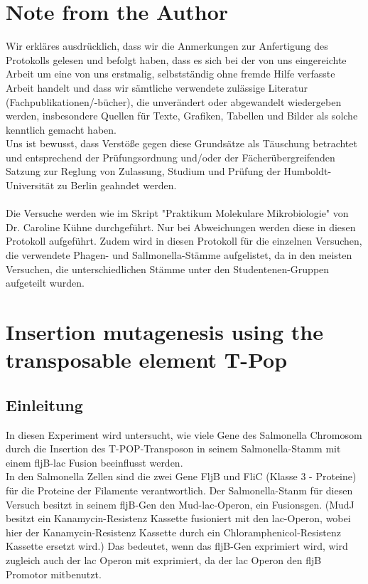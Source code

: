 \documentclass[oneside,10pt,a4paper]{report}
\begin{document}
	
	\tableofcontents
	\chapter{Note from the Author}
	Wir erkläres ausdrücklich, dass wir die Anmerkungen zur Anfertigung des Protokolls gelesen und befolgt haben, dass es sich bei der von uns eingereichte Arbeit um eine von uns erstmalig, selbstständig ohne fremde Hilfe verfasste Arbeit handelt und dass wir sämtliche verwendete zulässige Literatur (Fachpublikationen/-bücher), die unverändert oder abgewandelt wiedergeben werden, insbesondere Quellen für Texte, Grafiken, Tabellen und Bilder als solche kenntlich gemacht haben.\\
	Uns ist bewusst, dass Verstöße gegen diese Grundsätze als Täuschung betrachtet und entsprechend der Prüfungsordnung und/oder der Fächerübergreifenden Satzung zur Reglung von Zulassung, Studium und Prüfung der Humboldt-Universität zu Berlin geahndet werden.
	\\
	\\
	Die Versuche werden wie im Skript "Praktikum Molekulare Mikrobiologie" von Dr. Caroline Kühne \cite{Mibi-Script} durchgeführt. Nur bei Abweichungen werden diese in diesen Protokoll aufgeführt. Zudem wird in diesen Protokoll für die einzelnen Versuchen, die verwendete Phagen- und Sallmonella-Stämme aufgelistet, da in den meisten Versuchen, die unterschiedlichen Stämme unter den Studentenen-Gruppen aufgeteilt wurden.
	
	
	
	
	
	\chapter{Insertion mutagenesis using the transposable element T-Pop}	
	
		\section{Einleitung}
		In diesen Experiment wird untersucht, wie viele Gene des Salmonella Chromosom durch die Insertion des T-POP-Transposon in seinem Salmonella-Stamm mit einem fljB-lac Fusion beeinflusst werden.\\
		In den Salmonella Zellen sind die zwei Gene FljB und FliC (Klasse 3 - Proteine) für die Proteine der Filamente verantwortlich\cite{Flagellum}.
		 Der Salmonella-Stanm für diesen Versuch besitzt in seinem fljB-Gen den Mud-lac-Operon, ein Fusionsgen. (MudJ besitzt ein Kanamycin-Resistenz Kassette fusioniert mit den lac-Operon, wobei hier der Kanamycin-Resistenz Kassette durch ein Chloramphenicol-Resistenz Kassette ersetzt wird.)
		Das bedeutet, wenn das fljB-Gen exprimiert wird, wird zugleich auch der lac Operon mit exprimiert, da der lac Operon den fljB Promotor mitbenutzt.
		
\end{document}
